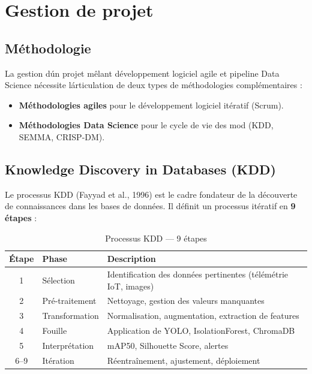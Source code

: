 \documentclass[12pt,a4paper,oneside]{report}
\begin{document}
\section{Gestion de projet}

\subsection{M\'ethodologie}

La gestion d\'un projet m\^elant d\'eveloppement logiciel agile et pipeline Data Science
n\'ecessite l\'articulation de deux types de m\'ethodologies compl\'ementaires :
\begin{itemize}
  \item \textbf{M\'ethodologies agiles} pour le d\'eveloppement logiciel it\'eratif (Scrum).
  \item \textbf{M\'ethodologies Data Science} pour le cycle de vie des mod\eles
        (KDD, SEMMA, CRISP-DM).
\end{itemize}

\subsection{Knowledge Discovery in Databases (KDD)}

Le processus KDD (Fayyad et al., 1996) est le cadre fondateur de la d\'ecouverte de
connaissances dans les bases de donn\'ees. Il d\'efinit un processus it\'eratif en
\textbf{9 \'etapes} :

\begin{table}[H]\centering
\caption{Processus KDD --- 9 \'etapes}
\label{tab:kdd}
\small
\begin{tabular}{clp{7cm}}
\toprule
\textbf{\'Etape} & \textbf{Phase} & \textbf{Description} \\
\midrule
1 & S\'election         & Identification des donn\'ees pertinentes (t\'el\'em\'etrie IoT, images) \\
2 & Pr\'e-traitement   & Nettoyage, gestion des valeurs manquantes \\
3 & Transformation     & Normalisation, augmentation, extraction de features \\
4 & Fouille            & Application de YOLO, IsolationForest, ChromaDB \\
5 & Interpr\'etation   & mAP50, Silhouette Score, alertes \\
6--9 & It\'eration      & R\'eentra\^inement, ajustement, d\'eploiement \\
\bottomrule
\end{tabular}
\end{table}
\end{document}
